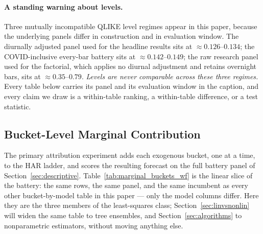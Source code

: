 \paragraph{A standing warning about levels.} Three mutually incompatible QLIKE level
regimes appear in this paper, because the underlying panels differ in construction and in
evaluation window. The diurnally adjusted panel used for the headline results sits at
$\approx 0.126$--$0.134$; the COVID-inclusive every-bar battery sits at
$\approx 0.142$--$0.149$; the raw research panel used for the factorial, which applies no
diurnal adjustment and retains overnight bars, sits at $\approx 0.35$--$0.79$. \emph{Levels
are never comparable across these three regimes.} Every table below carries its panel and
its evaluation window in the caption, and every claim we draw is a within-table ranking, a
within-table difference, or a test statistic.

\subsection{Bucket-Level Marginal Contribution}

The primary attribution experiment adds each exogenous bucket, one at a time, to the HAR
ladder, and scores the resulting forecast on the full battery panel of
Section~\ref{sec:descriptive}. Table~\ref{tab:marginal_buckets_wf} is the linear slice of
the battery: the same rows, the same panel, and the same incumbent as every other
bucket-by-model table in this paper --- only the model columns differ. Here they are the
three members of the least-squares class; Section~\ref{sec:linvsnonlin} will widen the
same table to tree ensembles, and Section~\ref{sec:algorithms} to nonparametric
estimators, without moving anything else.

